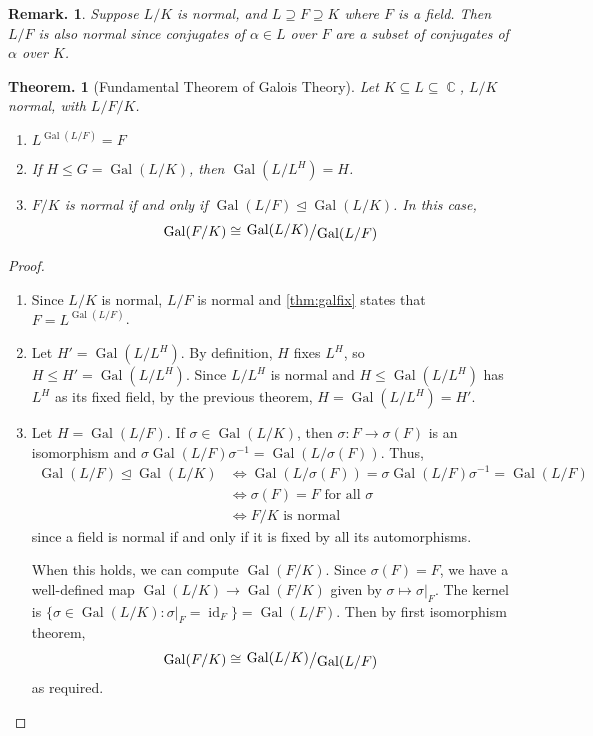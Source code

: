 \documentclass[11pt, a4paper]{memoir}
\DeclareMathOperator{\C}{{\mathbb{C}}}
\theoremstyle{change}
\newtheorem{theorem}{Theorem.}[section]
\theoremstyle{plain}
\theoremstyle{nonumberplain}
\newtheorem{remark}{Remark.}
\newtheorem{proof}{Proof}
\DeclareMathOperator{\Gal}{Gal}
\DeclareMathOperator{\id}{id}
\newcommand{\quot}[2]{\mathchoice{\left.\raisebox{0.13em}{$#1$}\middle/\raisebox{-0.13em}{$#2$}\right.}
                                 {\left.\raisebox{0.07em}{$#1$}\middle/\raisebox{-0.07em}{$#2$}\right.}
                                 {\left.\raisebox{0.03em}{$#1$}\middle/\raisebox{-0.03em}{$#2$}\right.}
                                 {\left.\raisebox{0em}{$#1$}\middle/\raisebox{0em}{$#2$}\right.}}
\numberwithin{equation}{section}
\begin{document}
\begin{remark}
    Suppose $L/K$ is normal, and $L\supseteq F\supseteq K$ where $F$ is a field.
    Then $L/F$ is also normal since conjugates of $\alpha\in L$ over $F$ are a subset of conjugates of $\alpha$ over $K$.
\end{remark}
\begin{theorem}[Fundamental Theorem of Galois Theory]\label{thm:ftfg}
    Let $K\subseteq L\subseteq\C$, $L/K$ normal, with $L/F/K$.
    \begin{enumerate}[nolistsep,label=(\roman*)]
        \item $L^{\Gal(L/F)}=F$
        \item If $H\leq G=\Gal(L/K)$, then $\Gal(L/L^H)=H$.
        \item $F/K$ is normal if and only if $\Gal(L/F)\trianglelefteq\Gal(L/K)$.
            In this case,
            \begin{equation*}
                \Gal(F/K)\cong\quot{\Gal(L/K)}{\Gal(L/F)}
            \end{equation*}
    \end{enumerate}
\end{theorem}
\begin{proof}
    \begin{enumerate}[label=(\roman*)]
        \item Since $L/K$ is normal, $L/F$ is normal and \cref{thm:galfix} states that $F=L^{\Gal(L/F)}$.
        \item Let $H'=\Gal(L/L^H)$.
            By definition, $H$ fixes $L^H$, so $H\leq H'=\Gal(L/L^H)$.
            Since $L/L^H$ is normal and $H\leq\Gal(L/L^H)$ has $L^H$ as its fixed field, by the previous theorem, $H=\Gal(L/L^H)=H'$.
        \item Let $H=\Gal(L/F)$.
            If $\sigma\in\Gal(L/K)$, then $\sigma:F\longrightarrow\sigma(F)$ is an isomorphism and $\sigma\Gal(L/F)\sigma^{-1}=\Gal(L/\sigma(F))$.
            Thus,
            \begin{align*}
                \Gal(L/F)\trianglelefteq\Gal(L/K) &\Longleftrightarrow \Gal(L/\sigma(F))=\sigma\Gal(L/F)\sigma^{-1}=\Gal(L/F)\\
                                                  &\Longleftrightarrow \sigma(F)=F\text{ for all }\sigma\\
                                                  &\Longleftrightarrow F/K\text{ is normal}
            \end{align*}
            since a field is normal if and only if it is fixed by all its automorphisms.

            When this holds, we can compute $\Gal(F/K)$.
            Since $\sigma(F)=F$, we have a well-defined map $\Gal(L/K)\to\Gal(F/K)$ given by $\sigma\mapsto\sigma|_F$.
            The kernel is $\{\sigma\in\Gal(L/K):\sigma|_F=\id_F\}=\Gal(L/F)$.
            Then by first isomorphism theorem,
            \begin{equation*}
                \Gal(F/K)\cong\quot{\Gal(L/K)}{\Gal(L/F)}
            \end{equation*}
            as required.
    \end{enumerate}
\end{proof}
\end{document}
